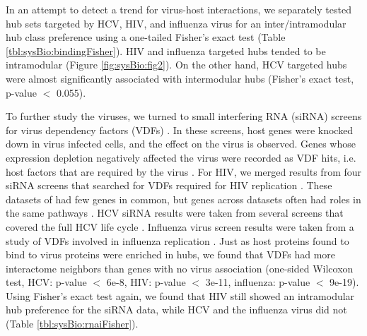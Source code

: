 In an attempt to detect a trend for virus-host interactions, we
separately tested hub sets targeted by HCV, HIV, and influenza virus
for an inter/intramodular hub class preference using a one-tailed
Fisher's exact test (Table \ref{tbl:sysBio:bindingFisher}). HIV and
influenza targeted hubs tended to be intramodular (Figure
\ref{fig:sysBio:fig2}). On the other hand, HCV targeted hubs were
almost significantly associated with intermodular hubs (Fisher's exact
test, p-value $<$ 0.055).


To further study the viruses, we turned to small interfering RNA
(siRNA) screens for virus dependency factors (VDFs)
\cite{bushman09,yeung09,Li09,konig2009human}. In these screens, host
genes were knocked down in virus infected cells, and the effect on the
virus is observed. Genes whose expression depletion negatively
affected the virus were recorded as VDF hits, i.e.\, host factors that
are required by the virus \cite{bushman09}. For HIV, we merged results
from four siRNA screens that searched for VDFs required for HIV
replication \cite{bushman09,yeung09}. These datasets of had few genes
in common, but genes across datasets often had roles in the same
pathways \cite{yeung09}. HCV siRNA results were taken from several
screens that covered the full HCV life cycle \cite{Li09}. Influenza
virus screen results were taken from a study of VDFs involved in
influenza replication \cite{konig2009human}. Just as host proteins
found to bind to virus proteins were enriched in hubs, we found that
VDFs had more interactome neighbors than genes with no virus
association (one-sided Wilcoxon test, HCV: p-value $<$ 6e-8, HIV:
p-value $<$ 3e-11, influenza: p-value $<$ 9e-19). Using Fisher's exact
test again, we found that HIV still showed an intramodular hub
preference for the siRNA data, while HCV and the influenza virus did
not (Table \ref{tbl:sysBio:rnaiFisher}).

